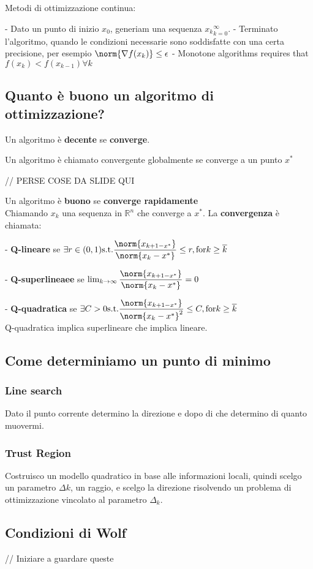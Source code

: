 \documentclass[\main/main.tex]{subfiles}
\begin{document}
Metodi di ottimizzazione continua:

- Dato un punto di inizio $x_0$, generiam una sequenza ${x_k}^\infty_{k=0}$.
- Terminato l'algoritmo, quando le condizioni necessarie sono soddisfatte con una certa precisione, per esempio $\norm{\nabla f(x_k)}\leq \epsilon$
- Monotone algorithms requires that $f(x_k) < f(x_{k-1}) \forall k$

\subsection{Quanto è buono un algoritmo di ottimizzazione?}

Un algoritmo è \textbf{decente} se \textbf{converge}.

\begin{definition}
	Un algoritmo è chiamato convergente globalmente se converge a un punto $x^*$
\end{definition}

// PERSE COSE DA SLIDE QUI

Un algoritmo è \textbf{buono} se \textbf{converge rapidamente}
\\

Chiamando $x_k$ una sequenza in $\mathbb{R}^n$ che converge a $x^*$. La \textbf{convergenza} è chiamata:

- \textbf{Q-lineare} se $\exists r \in (0,1) \text{s.t.} \dfrac{\norm{x_{k+1-x^*}}}{\norm{x_k - x^*}} \leq r, \text{for} k \geq \overline{k}$

- \textbf{Q-superlineaee} se $\lim_{k\rightarrow \infty} \dfrac{\norm{x_{k+1-x^*}}}{\norm{x_k - x^*}} = 0$

- \textbf{Q-quadratica} se $\exists C > 0 \text{s.t.} \dfrac{\norm{x_{k+1-x^*}}}{\norm{x_k - x^*}^2} \leq C, \text{for} k \geq \overline{k}$
\\

Q-quadratica implica superlineare che implica lineare.


\subsection{Come determiniamo un punto di minimo}

\subsubsection{Line search}
Dato il punto corrente determino la direzione e dopo di che determino di quanto muovermi.

\subsubsection{Trust Region}
Costruisco un modello quadratico in base alle informazioni locali, quindi scelgo un parametro $\Delta k$, un raggio, e scelgo la direzione risolvendo un problema di ottimizzazione vincolato al parametro $\Delta_k$.

\subsection{Condizioni di Wolf}

// Iniziare a guardare queste
\end{document}
